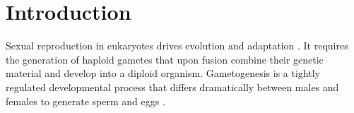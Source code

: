 
\section{Introduction}


Sexual reproduction in eukaryotes drives evolution and adaptation \citep{McDonald2016}. It requires the generation of haploid gametes that upon fusion combine their genetic material and develop into a diploid organism. Gametogenesis is a tightly regulated developmental process that differs dramatically between males and females to generate sperm and eggs \citep{Spiller2017}.\\

